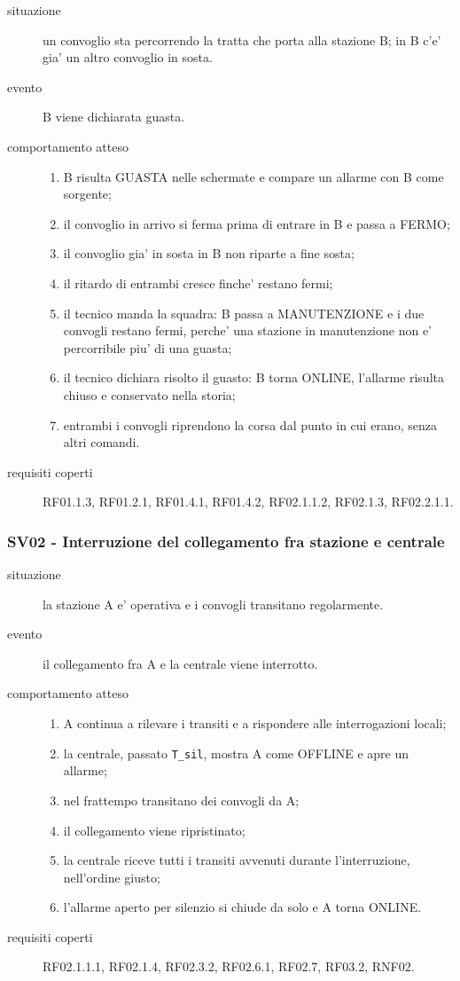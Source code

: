\documentclass[11pt]{article}
\begin{document}
\begin{description}
\item[{situazione}] un convoglio sta percorrendo la tratta che porta alla stazione B; in B c'e' gia' un
altro convoglio in sosta.
\item[{evento}] B viene dichiarata guasta.
\item[{comportamento atteso}] \begin{enumerate}
\item B risulta GUASTA nelle schermate e compare un allarme con B come sorgente;
\item il convoglio in arrivo si ferma prima di entrare in B e passa a FERMO;
\item il convoglio gia' in sosta in B non riparte a fine sosta;
\item il ritardo di entrambi cresce finche' restano fermi;
\item il tecnico manda la squadra: B passa a MANUTENZIONE e i due convogli restano fermi, perche'
una stazione in manutenzione non e' percorribile piu' di una guasta;
\item il tecnico dichiara risolto il guasto: B torna ONLINE, l'allarme risulta chiuso e conservato
nella storia;
\item entrambi i convogli riprendono la corsa dal punto in cui erano, senza altri comandi.
\end{enumerate}
\item[{requisiti coperti}] RF01.1.3, RF01.2.1, RF01.4.1, RF01.4.2, RF02.1.1.2, RF02.1.3, RF02.2.1.1.
\end{description}
\subsubsection{SV02 - Interruzione del collegamento fra stazione e centrale}
\label{sec:orgd1c075c}

\begin{description}
\item[{situazione}] la stazione A e' operativa e i convogli transitano regolarmente.
\item[{evento}] il collegamento fra A e la centrale viene interrotto.
\item[{comportamento atteso}] \begin{enumerate}
\item A continua a rilevare i transiti e a rispondere alle interrogazioni locali;
\item la centrale, passato \texttt{T\_sil}, mostra A come OFFLINE e apre un allarme;
\item nel frattempo transitano dei convogli da A;
\item il collegamento viene ripristinato;
\item la centrale riceve tutti i transiti avvenuti durante l'interruzione, nell'ordine giusto;
\item l'allarme aperto per silenzio si chiude da solo e A torna ONLINE.
\end{enumerate}
\item[{requisiti coperti}] RF02.1.1.1, RF02.1.4, RF02.3.2, RF02.6.1, RF02.7, RF03.2, RNF02.
\end{description}
\end{document}
